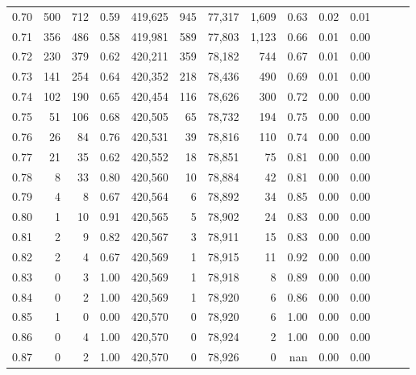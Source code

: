 \begin{tabular}{rrrrrrrrrrrrrr}
0.70 &     500 &    712 &  0.59 &  419,625 &      945 &  77,317 &   1,609 &  0.63 &  0.02 &      0.01 \\
0.71 &     356 &    486 &  0.58 &  419,981 &      589 &  77,803 &   1,123 &  0.66 &  0.01 &      0.00 \\
0.72 &     230 &    379 &  0.62 &  420,211 &      359 &  78,182 &     744 &  0.67 &  0.01 &      0.00 \\
0.73 &     141 &    254 &  0.64 &  420,352 &      218 &  78,436 &     490 &  0.69 &  0.01 &      0.00 \\
0.74 &     102 &    190 &  0.65 &  420,454 &      116 &  78,626 &     300 &  0.72 &  0.00 &      0.00 \\
0.75 &      51 &    106 &  0.68 &  420,505 &       65 &  78,732 &     194 &  0.75 &  0.00 &      0.00 \\
0.76 &      26 &     84 &  0.76 &  420,531 &       39 &  78,816 &     110 &  0.74 &  0.00 &      0.00 \\
0.77 &      21 &     35 &  0.62 &  420,552 &       18 &  78,851 &      75 &  0.81 &  0.00 &      0.00 \\
0.78 &       8 &     33 &  0.80 &  420,560 &       10 &  78,884 &      42 &  0.81 &  0.00 &      0.00 \\
0.79 &       4 &      8 &  0.67 &  420,564 &        6 &  78,892 &      34 &  0.85 &  0.00 &      0.00 \\
0.80 &       1 &     10 &  0.91 &  420,565 &        5 &  78,902 &      24 &  0.83 &  0.00 &      0.00 \\
0.81 &       2 &      9 &  0.82 &  420,567 &        3 &  78,911 &      15 &  0.83 &  0.00 &      0.00 \\
0.82 &       2 &      4 &  0.67 &  420,569 &        1 &  78,915 &      11 &  0.92 &  0.00 &      0.00 \\
0.83 &       0 &      3 &  1.00 &  420,569 &        1 &  78,918 &       8 &  0.89 &  0.00 &      0.00 \\
0.84 &       0 &      2 &  1.00 &  420,569 &        1 &  78,920 &       6 &  0.86 &  0.00 &      0.00 \\
0.85 &       1 &      0 &  0.00 &  420,570 &        0 &  78,920 &       6 &  1.00 &  0.00 &      0.00 \\
0.86 &       0 &      4 &  1.00 &  420,570 &        0 &  78,924 &       2 &  1.00 &  0.00 &      0.00 \\
0.87 &       0 &      2 &  1.00 &  420,570 &        0 &  78,926 &       0 &   nan &  0.00 &      0.00 \\

\end{tabular}
